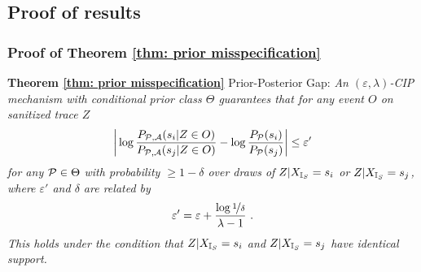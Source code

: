 \clearpage

\subsection{Proof of results}
\label{apx: proofs} 
\subsubsection{Proof of Theorem \ref{thm: prior misspecification}} 
\textbf{Theorem \ref{thm: prior misspecification}} Prior-Posterior Gap:
\textit{
An $(\varepsilon, \lambda)$-CIP mechanism with conditional prior class $\Theta$ guarantees that for any event $O$ on sanitized trace $Z$
	\begin{align*}
		\bigg| \log \frac{P_{\mathcal{P}, \mathcal{A}}(s_i | Z \in O)}{P_{\mathcal{P}, \mathcal{A}}(s_j | Z \in O)} - \log \frac{P_{\mathcal{P}}(s_i)}{P_{\mathcal{P}}(s_j)} \bigg| \leq \varepsilon'
	\end{align*}
	for any $\mathcal{P} \in \Theta$ with probability $\geq 1 - \delta$ over draws of $Z|{X_{\mathbb{I}_S}}=s_i$ or $Z|{X_{\mathbb{I}_S}}=s_j$, where $\varepsilon'$ and $\delta$ are related by
	\begin{align*}
		\varepsilon' = \varepsilon + \frac{\log \nicefrac{1}{\delta}}{\lambda - 1} \ .
	\end{align*}
	This holds under the condition that $Z|{X_{\mathbb{I}_S}} = s_i$ and $Z|{X_{\mathbb{I}_S}} = s_j$ have identical support. 
}

